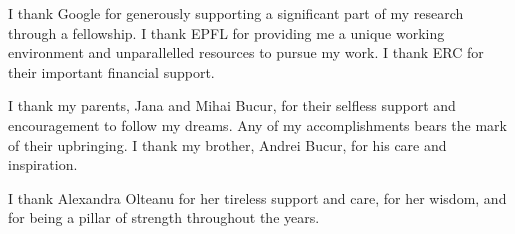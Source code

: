 I thank Google for generously supporting a significant part of my research through a fellowship.
%
I thank EPFL for providing me a unique working environment and unparallelled resources to pursue my work.
%
I thank ERC for their important financial support.


I thank my parents, Jana and Mihai Bucur, for their selfless support and encouragement to follow my dreams.  Any of my accomplishments bears the mark of their upbringing.
%
I thank my brother, Andrei Bucur, for his care and inspiration.


I thank Alexandra Olteanu for her tireless support and care, for her wisdom, and for being a pillar of strength throughout the years.

